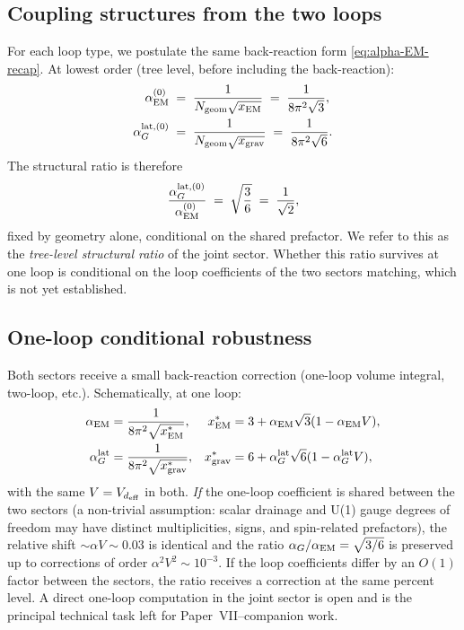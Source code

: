 \documentclass[11pt,a4paper]{article}
\begin{document}
\subsection{Coupling structures from the two loops}

For each loop type, we postulate the same back-reaction form
\eqref{eq:alpha-EM-recap}. At lowest order (tree level, before
including the back-reaction):
\begin{align}
\alpha_{\rm EM}^{(0)} &\;=\; \frac{1}{N_{\rm geom}\sqrt{x_{\rm EM}}}
\;=\; \frac{1}{8\pi^2\sqrt{3}}, \\
\alpha_G^{{\rm lat},(0)} &\;=\; \frac{1}{N_{\rm geom}\sqrt{x_{\rm grav}}}
\;=\; \frac{1}{8\pi^2\sqrt{6}}.
\end{align}
The structural ratio is therefore
\begin{equation}
\frac{\alpha_G^{{\rm lat},(0)}}{\alpha_{\rm EM}^{(0)}}
\;=\; \sqrt{\frac{3}{6}} \;=\; \frac{1}{\sqrt{2}},
\label{eq:ratio-tree}
\end{equation}
fixed by geometry alone, conditional on the shared
prefactor. We refer to this as the \emph{tree-level structural
ratio} of the joint sector. Whether this ratio survives at one
loop is conditional on the loop coefficients of the two sectors
matching, which is not yet established.

\subsection{One-loop conditional robustness}

Both sectors receive a small back-reaction correction (one-loop
volume integral, two-loop, etc.). Schematically, at one loop:
\begin{align}
\alpha_{\rm EM} &= \frac{1}{8\pi^2\sqrt{x_{\rm EM}^*}},
& x_{\rm EM}^* &= 3 + \alpha_{\rm EM}\sqrt{3}(1 - \alpha_{\rm EM}V), \\
\alpha_G^{\rm lat} &= \frac{1}{8\pi^2\sqrt{x_{\rm grav}^*}},
& x_{\rm grav}^* &= 6 + \alpha_G^{\rm lat}\sqrt{6}(1 - \alpha_G^{\rm lat}V),
\end{align}
with the same $V = V_{d_{\rm eff}}$ in both. \emph{If} the
one-loop coefficient is shared between the two sectors (a
non-trivial assumption: scalar drainage and U(1) gauge degrees
of freedom may have distinct multiplicities, signs, and
spin-related prefactors), the relative shift $\sim \alpha V \sim
0.03$ is identical and the ratio $\alpha_G/\alpha_{\rm EM}
= \sqrt{3/6}$ is preserved up to corrections of order $\alpha^2
V^2 \sim 10^{-3}$. If the loop coefficients differ by an
$O(1)$ factor between the sectors, the ratio receives a
correction at the same percent level. A direct one-loop
computation in the joint sector is open and is the principal
technical task left for Paper~VII--companion work.
\end{document}
